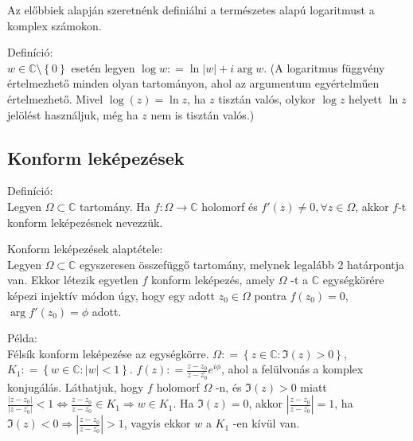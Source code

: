 \documentclass[12pt,a4paper]{scrartcl}
\newenvironment{definicio}{}{}
\newenvironment{tetel}{}{}
\newenvironment{pelda}{}{}
\begin{document}
Az előbbiek alapján szeretnénk definiálni a természetes alapú
logaritmust a komplex számokon.

\begin{definicio}

Definíció:\\
\(w \in {\mathbb{C}}\text{\textbackslash}\left\{ 0 \right\}\) esetén
legyen \(\log w: = \ln\left| w \right| + i\arg w\). (A logaritmus
függvény értelmezhető minden olyan tartományon, ahol az argumentum
egyértelműen értelmezhető. Mivel \(\log\left( z \right) = \ln z\), ha
\(z\) tisztán valós, olykor \(\log z\) helyett \(\ln z\) jelölést
használjuk, még ha \(z\) nem is tisztán valós.)

\end{definicio}

\hypertarget{konform-lekepezesek}{%
\subsection{Konform leképezések}\label{konform-lekepezesek}}

\begin{definicio}

Definíció:\\
Legyen \(\Omega \subset {\mathbb{C}}\) tartomány. Ha
\(\left. f:\Omega\rightarrow{\mathbb{C}} \right.\) holomorf és
\(f'\left( z \right) \neq 0,\forall z \in \Omega\), akkor \(f\)-t
konform leképezésnek nevezzük.

\end{definicio}

\begin{tetel}

Konform leképezések alaptétele:\\
Legyen \(\Omega \subset {\mathbb{C}}\) egyszeresen összefüggő tartomány,
melynek legalább 2 határpontja van. Ekkor létezik egyetlen \(f\) konform
leképezés, amely \(\Omega\) -t a \(\mathbb{C}\) egységkörére képezi
injektív módon úgy, hogy egy adott \(z_{0} \in \Omega\) pontra
\(f\left( z_{0} \right) = 0\), \(\arg f'\left( z_{0} \right) = \phi\)
adott.

\end{tetel}

\begin{pelda}

Példa:\\
Félsík konform leképezése az egységkörre.
\(\Omega: = \left\{ {z \in {\mathbb{C}}:\Im\left( z \right) > 0} \right\}\),
\(K_{1}: = \left\{ {w \in {\mathbb{C}}:\left| w \right| < 1} \right\}\).
\(f\left( z \right): = \frac{z - z_{0}}{z - \overline{z_{0}}}e^{i\phi}\),
ahol a felülvonás a komplex konjugálás. Láthatjuk, hogy \(f\) holomorf
\(\Omega\) -n, és \(\Im\left( z \right) > 0\) miatt
\(\left. \frac{\left| {z - z_{0}} \right|}{\left| {z - \overline{z_{0}}} \right|} < 1\Leftrightarrow\frac{z - z_{0}}{z - \overline{z_{0}}} \in K_{1}\Rightarrow w \in K_{1} \right.\).
Ha \(\Im\left( z \right) = 0\), akkor
\(\left| \frac{z - z_{0}}{z - \overline{z_{0}}} \right| = 1\), ha
\(\left. \Im\left( z \right) < 0\Rightarrow\left| \frac{z - z_{0}}{z - \overline{z_{0}}} \right| > 1 \right.\),
vagyis ekkor \(w\) a \(K_{1}\) -en kívül van.

\end{pelda}
\end{document}
